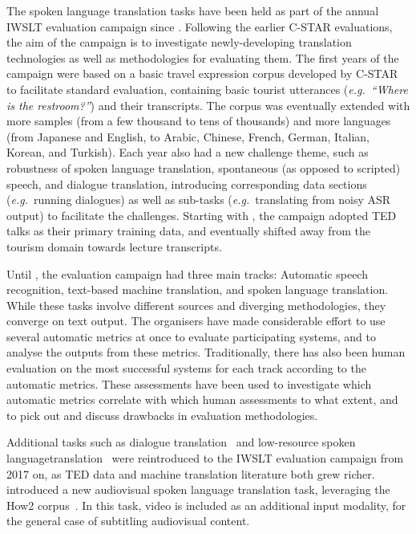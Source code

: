\documentclass{svjour3}
\newcommand{\eg}[1]{\textit{e.g.}~#1}
\begin{document}
            The spoken language translation tasks have been held as part of the annual IWSLT evaluation campaign since
\citet{akiba-overview-2004}.
            Following the earlier C-STAR evaluations, the
aim of the campaign is to investigate
newly-developing translation technologies as well as methodologies for evaluating them.
The first years of the campaign were based on a basic travel expression corpus developed by C-STAR to facilitate standard evaluation, containing basic tourist utterances (\eg{\emph{``Where is the restroom?''}}) and their transcripts. The corpus was eventually extended with more samples (from a few thousand to tens of thousands) and more languages (from Japanese and English, to Arabic, Chinese, French, German, Italian, Korean, and Turkish). Each year also had a new challenge theme, such as robustness of spoken language translation, spontaneous (as opposed to scripted) speech, and dialogue translation, introducing corresponding data sections (\eg{running dialogues}) as well as sub-tasks (\eg{translating from noisy ASR output}) to facilitate the challenges. Starting with \citet{paul-overview-2010}, the campaign adopted TED talks as their primary training data, and eventually shifted away from the tourism domain towards lecture transcripts.
            
            Until \citet{cettolo-iwslt-2016}, the evaluation campaign had three main tracks: Automatic speech recognition, text-based machine translation, and spoken language translation. While these tasks involve different sources and diverging methodologies, they converge on text output. The organisers have made considerable effort to use several automatic metrics at once to evaluate participating systems, and to analyse the outputs from these metrics. Traditionally, there has also been human evaluation on the most successful systems for each track according to the automatic metrics. These assessments have been used to investigate which automatic metrics correlate with which human assessments to what extent, and to pick out and discuss drawbacks in evaluation methodologies.
            
            Additional tasks such as dialogue translation~\citep{cettolo-overview-2017} and low-resource spoken language\linebreak translation~\citep{niehues-iwslt-2018} were reintroduced to the IWSLT evaluation campaign from 2017 on, as TED data and machine translation literature both grew richer. \citet{niehues-iwslt-2019} introduced a new audiovisual spoken language translation task, leveraging the How2 corpus~\citep{sanabria-how2:-2018}. In this task, video is included as an additional input modality, for the general case of subtitling audiovisual content.
 
\end{document}
